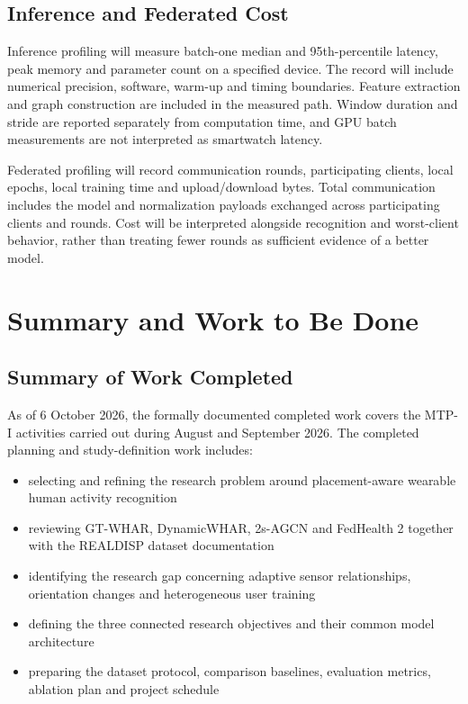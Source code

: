 \documentclass[10pt,a4paper,oneside,openany]{report}
\begin{document}
\section{Inference and Federated Cost}

Inference profiling will measure batch-one median and 95th-percentile latency, peak memory and parameter count on a specified device. The record will include numerical precision, software, warm-up and timing boundaries. Feature extraction and graph construction are included in the measured path. Window duration and stride are reported separately from computation time, and GPU batch measurements are not interpreted as smartwatch latency.

Federated profiling will record communication rounds, participating clients, local epochs, local training time and upload/download bytes. Total communication includes the model and normalization payloads exchanged across participating clients and rounds. Cost will be interpreted alongside recognition and worst-client behavior, rather than treating fewer rounds as sufficient evidence of a better model.

\cleardoublepage
\chapter{Summary and Work to Be Done}
\label{chap:summary-work}

\section{Summary of Work Completed}

As of 6 October 2026, the formally documented completed work covers the MTP-I activities carried out during August and September 2026. The completed planning and study-definition work includes:

\begin{itemize}
\item selecting and refining the research problem around placement-aware wearable human activity recognition
\item reviewing GT-WHAR, DynamicWHAR, 2s-AGCN and FedHealth 2 together with the REALDISP dataset documentation
\item identifying the research gap concerning adaptive sensor relationships, orientation changes and heterogeneous user training
\item defining the three connected research objectives and their common model architecture
\item preparing the dataset protocol, comparison baselines, evaluation metrics, ablation plan and project schedule
\end{itemize}
\end{document}
